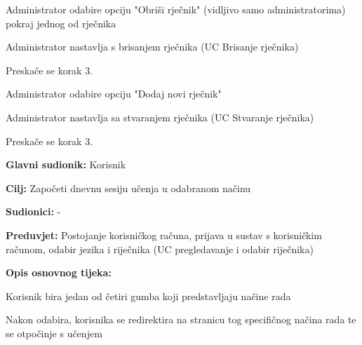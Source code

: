 \begin{packed_item}
\begin{packed_item}
\begin{packed_enum}
							\end{packed_enum}
							\item[2.a] Administrator odabire opciju "Obriši rječnik" (vidljivo samo administratorima) pokraj jednog od rječnika
							\item[] \begin{packed_enum}
								
								\item Administrator nastavlja s brisanjem rječnika (UC Brisanje rječnika)
								\item Preskače se korak 3.
								
							\end{packed_enum}
							\item[2.b] Administrator odabire opciju "Dodaj novi rječnik"
							\item[] \begin{packed_enum}
								
								\item Administrator nastavlja sa stvaranjem rječnika (UC Stvaranje rječnika)
								\item Preskače se korak 3.
								
							\end{packed_enum}
							
						\end{packed_item}
						
					\end{packed_item}


					\noindent {}
					\begin{packed_item}

						\item \textbf{Glavni sudionik: } Korisnik
						\item \textbf{Cilj: } Započeti dnevnu sesiju učenja u odabranom načinu
						\item \textbf{Sudionici: } -
						\item \textbf{Preduvjet: } Postojanje korisničkog računa, prijava u sustav s korisničkim računom, odabir jezika i riječnika (UC pregledavanje i odabir riječnika)
						\item  \textbf{Opis osnovnog tijeka:}
						
						\item[] \begin{packed_enum}
							
							\item Korisnik bira jedan od četiri gumba koji predstavljaju načine rada
							\item Nakon odabira, korisnika se redirektira na stranicu tog specifičnog
							načina rada te se otpočinje s učenjem

						\end{packed_enum}

						
					\end{packed_item}


